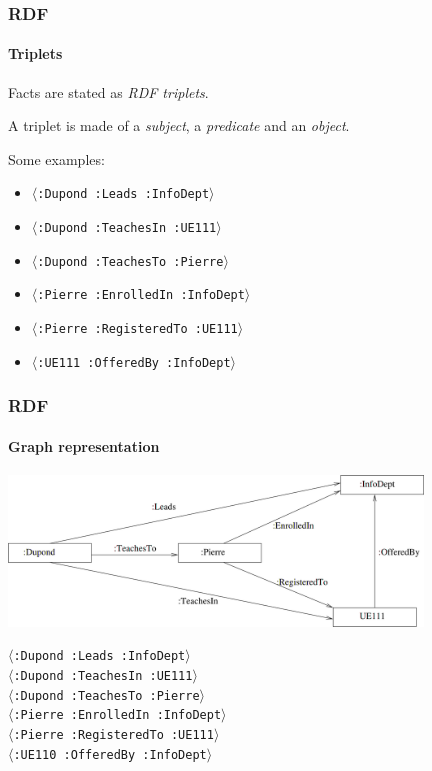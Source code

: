 \documentclass{beamer}
\newcommand{\triplet}[1]{$\langle$\texttt{#1}$\rangle$}
\begin{document}
\begin{frame}
  \frametitle{RDF}
  \framesubtitle{Triplets}

  Facts are stated as \textit{RDF triplets}.

  \pause

  \medskip

  A triplet is made of a \textit{subject}, a \textit{predicate} and an
  \textit{object}.

  \pause

  \medskip

  Some examples:

  \pause

  \begin{itemize}
    \item \triplet{:Dupond :Leads :InfoDept}

    \pause

    \item \triplet{:Dupond :TeachesIn :UE111}

    \pause

    \item \triplet{:Dupond :TeachesTo :Pierre}

    \pause

    \item \triplet{:Pierre :EnrolledIn :InfoDept}

    \pause

    \item \triplet{:Pierre :RegisteredTo :UE111}

    \pause

    \item \triplet{:UE111 :OfferedBy :InfoDept}
  \end{itemize}
\end{frame}

\begin{frame}
  \frametitle{RDF}
  \framesubtitle{Graph representation}

  \begin{center}
    \includegraphics[width=11cm]{graph.png}
  \end{center}

  \triplet{:Dupond :Leads :InfoDept} \\
  \triplet{:Dupond :TeachesIn :UE111} \\
  \triplet{:Dupond :TeachesTo :Pierre} \\
  \triplet{:Pierre :EnrolledIn :InfoDept} \\
  \triplet{:Pierre :RegisteredTo :UE111} \\
  \triplet{:UE110 :OfferedBy :InfoDept}
\end{frame}
\end{document}
